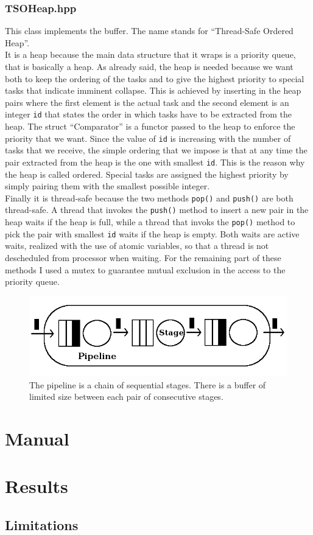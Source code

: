 \documentclass[12pt]{article}
\begin{document}
\subsubsection{TSOHeap.hpp}
This class implements the buffer. The name stands for ``Thread-Safe Ordered Heap''. \\
It is a heap because the main data structure that it wraps is a priority queue, that is basically a heap. As already said, the heap is needed because we want both to keep the ordering of the tasks and to give the highest priority to special tasks that indicate imminent collapse. This is achieved by inserting in the heap pairs where the first element is the actual task and the second element is an integer \texttt{id} that states the order in which tasks have to be extracted from the heap. The struct ``Comparator'' is a functor passed to the heap to enforce the priority that we want. Since the value of \texttt{id} is increasing with the number of tasks that we receive, the simple ordering that we impose is that at any time the pair extracted from the heap is the one with smallest \texttt{id}. This is the reason why the heap is called ordered. Special tasks are assigned the highest priority by simply pairing them with the smallest possible integer. \\
Finally it is thread-safe because the two methods  \texttt{pop()} and \texttt{push()} are both thread-safe. A thread that invokes the \texttt{push()} method to insert a new pair in the heap waits if the heap is full, while a thread that invoks the \texttt{pop()} method to pick the pair with smallest \texttt{id} waits if the heap is empty. Both waits are active waits, realized with the use of atomic variables, so that a thread is not descheduled from processor when waiting. For the remaining part of these methods I used a mutex to guarantee mutual exclusion in the access to the priority queue.
  

\begin{figure}
\centering
\includegraphics[scale=0.43]{Pipe}
\caption{The pipeline is a chain of sequential stages. There is a buffer of limited size between each pair of consecutive stages.}
\label{fig:pipe}
\end{figure}     

\section{Manual}
    

\section{Results}

\subsection{Limitations}
\end{document}
